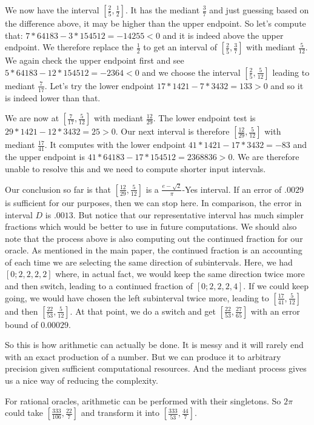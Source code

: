 \documentclass[12pt]{article}
\theoremstyle{remark}
\begin{document}
We now have the interval $[\frac{2}{5}, \frac{1}{2}]$. It has the mediant $\frac{3}{7}$ and just guessing based on the difference above, it may be higher than the upper endpoint. So let's compute that: $7*64183- 3*154512 = -14255 < 0$ and it is indeed above the upper endpoint. We therefore replace the $\frac{1}{2}$ to get an interval of $[\frac{2}{5}, \frac{3}{7}]$ with mediant $\frac{5}{12}$. We again check the upper endpoint first and see $5*64183 - 12*154512 = -2364 < 0$ and we choose the interval $[\frac{2}{5}, \frac{5}{12}]$ leading to mediant $\frac{7}{17}$. Let's try the lower endpoint 
$17*1421 - 7*3432 = 133 > 0$ and so it is indeed lower than that. 

We are now at $[\frac{7}{17}, \frac{5}{12}]$ with mediant $\frac{12}{29}$. The lower endpoint test is $29*1421 - 12*3432 = 25 > 0$. Our next interval is therefore $[\frac{12}{29}, \frac{5}{12}]$ with mediant $\frac{17}{41}$. It computes with the lower endpoint $41*1421-17*3432 = -83$ and the upper endpoint is $41*64183-17*154512 = 2368836 >0$. We are therefore unable to resolve this and we need to compute shorter input intervals. 

Our conclusion so far is that $[\frac{12}{29}, \frac{5}{12}]$ is a $\frac{e-\sqrt{2}}{\pi}$-Yes interval. If an error of $.0029$ is sufficient for our purposes, then we can stop here. In comparison, the error in interval $D$ is $.0013$. But notice that our representative interval has much simpler fractions which would be better to use in future computations. We should also note that the process above is also computing out the continued fraction for our oracle. As mentioned in the main paper, the continued fraction is an accounting of each time we are selecting the same direction of subintervals. Here, we had $[0;2,2,2, 2]$ where, in actual fact, we would keep the same direction twice more and then switch, leading to a continued fraction of $[0;2,2,2,4]$. If we could keep going, we would have chosen the left subinterval twice more, leading to $[\frac{17}{41}, \frac{5}{12}]$ and then $[\frac{22}{53}, \frac{5}{12}]$. At that point, we do a switch and get $[\frac{22}{53}, \frac{27}{65}]$ with an error bound of $0.00029$.  

So this is how arithmetic can actually be done. It is messy and it will rarely end with an exact production of a number. But we can produce it to arbitrary precision given sufficient computational resources. And the mediant process gives us a nice way of reducing the complexity. 

For rational oracles, arithmetic can be performed with their singletons. So $2 \pi$ could take $[\frac{333}{106}, \frac{22}{7}]$ and transform it into $[\frac{333}{53}, \frac{44}{7}]$.  
\end{document}
